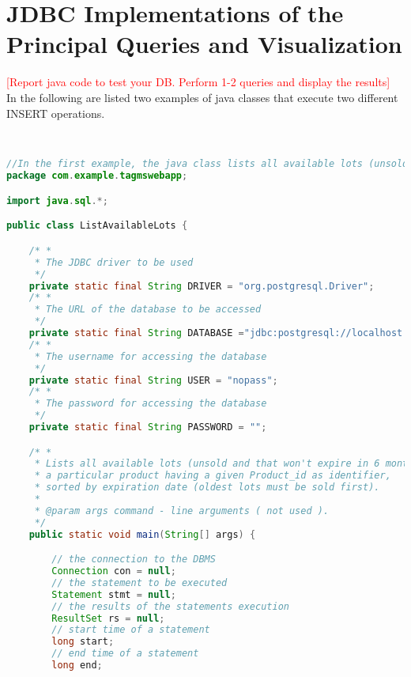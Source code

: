 \section{JDBC Implementations of the Principal Queries and Visualization}
\textcolor{red}{[Report java code to test your DB. Perform 1-2 queries and display the results]}\\
In the following are listed two examples of java classes that execute two different INSERT operations.



\begin{lstlisting}[language=JAVA,
commentstyle = \color{gray},
keywordstyle = \color{blue}, 
stringstyle = \color{ForestGreen}, 
rulecolor = \color{black},
breaklines=true,
basicstyle=\ttfamily\footnotesize,
showstringspaces=false]


//In the first example, the java class lists all available lots (unsold and that won't expire in 6 months) containing a particular product having a given Product_id as identifier, sorted by expiration date (oldest lots must be sold first).
package com.example.tagmswebapp;

import java.sql.*;

public class ListAvailableLots {

    /* *
     * The JDBC driver to be used
     */
    private static final String DRIVER = "org.postgresql.Driver";
    /* *
     * The URL of the database to be accessed
     */
    private static final String DATABASE ="jdbc:postgresql://localhost:5432/tagmsdb";
    /* *
     * The username for accessing the database
     */
    private static final String USER = "nopass";
    /* *
     * The password for accessing the database
     */
    private static final String PASSWORD = "";

    /* *
     * Lists all available lots (unsold and that won't expire in 6 months) containing
     * a particular product having a given Product_id as identifier,
     * sorted by expiration date (oldest lots must be sold first).
     *
     * @param args command - line arguments ( not used ).
     */
    public static void main(String[] args) {

        // the connection to the DBMS
        Connection con = null;
        // the statement to be executed
        Statement stmt = null;
        // the results of the statements execution
        ResultSet rs = null;
        // start time of a statement
        long start;
        // end time of a statement
        long end;


\end{lstlisting}
